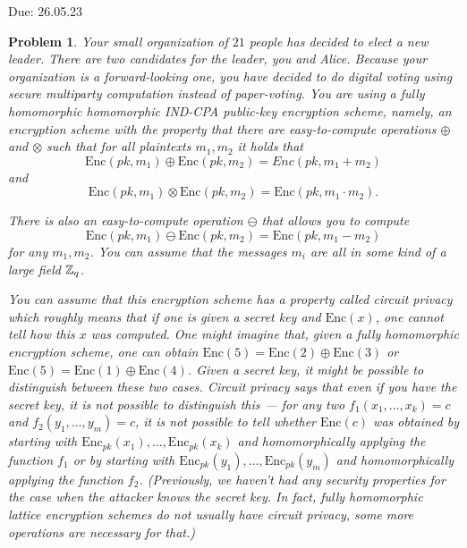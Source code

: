 \documentclass{../homework}
\newtheorem{problem}{Problem}
\newcommand{\Enc}{\text{Enc}}
\begin{document}
{Due: 26.05.23}{\profname}{\myname}

\begin{problem}
    Your small organization of $21$ people has decided to elect a new leader.
    There are two candidates for the leader, you and Alice.
    Because your organization is a forward-looking one, you have decided to do
    digital voting using secure multiparty computation instead of paper-voting.
    You are using a fully homomorphic homomorphic IND-CPA public-key encryption
    scheme, namely, an encryption scheme with the property that there are
    easy-to-compute operations $\oplus$ and $\otimes$ such that for all
    plaintexts $m_1,m_2$ it holds that
    $$
        \Enc(pk,m_1)\oplus \Enc(pk,m_2)=Enc(pk,m_1+m_2)
    $$
    and
    $$
        \Enc(pk,m_1)\otimes \Enc(pk,m_2)=\Enc(pk,m_1\cdot m_2).
    $$
    
    There is also an easy-to-compute operation $\ominus$ that allows you to
    compute
    $$
        \Enc(pk,m_1)\ominus \Enc(pk,m_2)=\Enc(pk,m_1- m_2)
    $$
    for any $m_1,m_2$.
    You can assume that the messages $m_i$ are all in some kind of a large
    field $\mathbb Z_q$.
    
    You can assume that this encryption scheme has a property called
    \emph{circuit privacy} which roughly means that if one is given a secret
    key and $\Enc(x)$, one cannot tell how this $x$ was computed.
    One might imagine that, given a fully homomorphic encryption scheme, one
    can obtain
    $\Enc(5)=\Enc(2)\oplus \Enc(3)$
    or
    $\Enc(5)=\Enc(1)\oplus \Enc(4)$.
    Given a secret key, it might be possible to distinguish between these two
    cases.
    Circuit privacy says that even if you have the secret key, it is not
    possible to distinguish this --- for any two
    $f_1(x_1,\dots,x_k)=c$
    and
    $f_2(y_1,\dots,y_m)=c$,
    it is not possible to tell whether $\Enc(c)$ was obtained by starting with
    $\Enc_{pk}(x_1),\dots,\Enc_{pk}(x_k)$
    and homomorphically applying the function $f_1$ or by starting with
    $\Enc_{pk}(y_1),\dots,\Enc_{pk}(y_m)$
    and homomorphically applying the function $f_2$.
    (Previously, we haven't had any security properties for the case when the
    attacker knows the secret key. In fact, fully homomorphic lattice
    encryption schemes do not usually have circuit privacy, some more
    operations are necessary for that.)

 

\end{problem}
\end{document}
